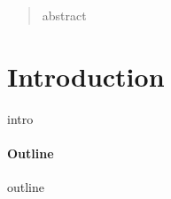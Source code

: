 \begin{abstract}
abstract
\end{abstract}

\section{Introduction}
intro

\paragraph{Outline}
outline


